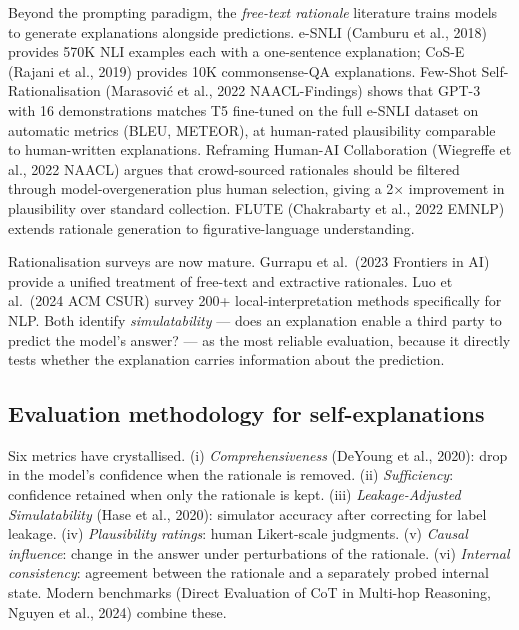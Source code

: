 Beyond the prompting paradigm, the \emph{free-text rationale} literature trains models to generate explanations alongside predictions. e-SNLI (Camburu et al., 2018) provides 570K NLI examples each with a one-sentence explanation; CoS-E (Rajani et al., 2019) provides 10K commonsense-QA explanations. Few-Shot Self-Rationalisation (Marasović et al., 2022 NAACL-Findings) shows that GPT-3 with 16 demonstrations matches T5 fine-tuned on the full e-SNLI dataset on automatic metrics (BLEU, METEOR), at human-rated plausibility comparable to human-written explanations. Reframing Human-AI Collaboration (Wiegreffe et al., 2022 NAACL) argues that crowd-sourced rationales should be filtered through model-overgeneration plus human selection, giving a 2× improvement in plausibility over standard collection. FLUTE (Chakrabarty et al., 2022 EMNLP) extends rationale generation to figurative-language understanding.

Rationalisation surveys are now mature. Gurrapu et al.~(2023 Frontiers in AI) provide a unified treatment of free-text and extractive rationales. Luo et al.~(2024 ACM CSUR) survey 200+ local-interpretation methods specifically for NLP. Both identify \emph{simulatability} --- does an explanation enable a third party to predict the model's answer? --- as the most reliable evaluation, because it directly tests whether the explanation carries information about the prediction.

\subsection{Evaluation methodology for self-explanations}\label{evaluation-methodology-for-self-explanations}

Six metrics have crystallised. (i) \emph{Comprehensiveness} (DeYoung et al., 2020): drop in the model's confidence when the rationale is removed. (ii) \emph{Sufficiency}: confidence retained when only the rationale is kept. (iii) \emph{Leakage-Adjusted Simulatability} (Hase et al., 2020): simulator accuracy after correcting for label leakage. (iv) \emph{Plausibility ratings}: human Likert-scale judgments. (v) \emph{Causal influence}: change in the answer under perturbations of the rationale. (vi) \emph{Internal consistency}: agreement between the rationale and a separately probed internal state. Modern benchmarks (Direct Evaluation of CoT in Multi-hop Reasoning, Nguyen et al., 2024) combine these.

